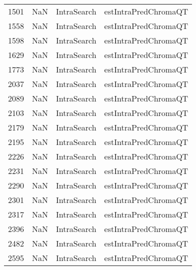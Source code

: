 \begin{tabular}{llll}
1501 &                   NaN &                IntraSearch &                      estIntraPredChromaQT \\
1558 &                   NaN &                IntraSearch &                      estIntraPredChromaQT \\
1598 &                   NaN &                IntraSearch &                      estIntraPredChromaQT \\
1629 &                   NaN &                IntraSearch &                      estIntraPredChromaQT \\
1773 &                   NaN &                IntraSearch &                      estIntraPredChromaQT \\
2037 &                   NaN &                IntraSearch &                      estIntraPredChromaQT \\
2089 &                   NaN &                IntraSearch &                      estIntraPredChromaQT \\
2103 &                   NaN &                IntraSearch &                      estIntraPredChromaQT \\
2179 &                   NaN &                IntraSearch &                      estIntraPredChromaQT \\
2195 &                   NaN &                IntraSearch &                      estIntraPredChromaQT \\
2226 &                   NaN &                IntraSearch &                      estIntraPredChromaQT \\
2231 &                   NaN &                IntraSearch &                      estIntraPredChromaQT \\
2290 &                   NaN &                IntraSearch &                      estIntraPredChromaQT \\
2301 &                   NaN &                IntraSearch &                      estIntraPredChromaQT \\
2317 &                   NaN &                IntraSearch &                      estIntraPredChromaQT \\
2396 &                   NaN &                IntraSearch &                      estIntraPredChromaQT \\
2482 &                   NaN &                IntraSearch &                      estIntraPredChromaQT \\
2595 &                   NaN &                IntraSearch &                      estIntraPredChromaQT \\

\end{tabular}
